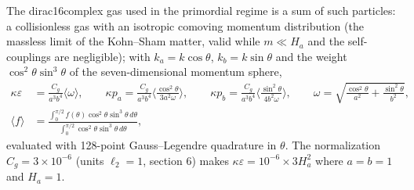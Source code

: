 \documentclass[10pt,a4paper]{article}
\begin{document}
The dirac16complex gas used in the primordial regime is a sum of such particles: a collisionless gas with an isotropic comoving momentum distribution (the massless limit of the Kohn–Sham matter, valid while $m\ll H_a$ and the self-couplings are negligible); with $k_a=k\cos\theta$, $k_b=k\sin\theta$ and the weight $\cos^2\theta\sin^3\theta$ of the seven-dimensional momentum sphere,
\begin{align*}
\kappa\varepsilon&=\frac{C_g}{a^3b^4}\big\langle\omega\big\rangle,\qquad \kappa p_a=\frac{C_g}{a^3b^4}\Big\langle\frac{\cos^2\theta}{3a^2\omega}\Big\rangle,\qquad \kappa p_b=\frac{C_g}{a^3b^4}\Big\langle\frac{\sin^2\theta}{4b^2\omega}\Big\rangle,\qquad \omega=\sqrt{\frac{\cos^2\theta}{a^2}+\frac{\sin^2\theta}{b^2}}, \\
\langle f\rangle&=\frac{\int_0^{\pi/2}f(\theta)\cos^2\theta\sin^3\theta\,d\theta}{\int_0^{\pi/2}\cos^2\theta\sin^3\theta\,d\theta},
\end{align*}
evaluated with 128-point Gauss–Legendre quadrature in $\theta$. The normalization $C_g=3\times10^{-6}$ (units $\ell_2=1$, section 6) makes $\kappa\varepsilon=10^{-6}\times3H_a^2$ where $a=b=1$ and $H_a=1$.
\end{document}
